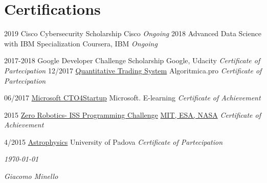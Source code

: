 \documentclass[]{friggeri-cv}
\begin{document}
\section{Certifications}
\begin{entrylist}
      \entry
    {2019}
    {Cisco Cybersecurity Scholarship}
    {Cisco}
    {\emph{Ongoing}}
     \entry
    {2018}
    {Advanced Data Science with IBM Specialization}
    {Coursera, IBM}
    {\emph{Ongoing}}
    
    \entry
    {2017-2018}
    {Google Developer Challenge Scholarship}
    {Google, Udacity}
    {\emph{Certificate of Partecipation}}
    \entry
    {12/2017}
    {\href{}{Quantitative Trading System}}
    {Algoritmica.pro}
    {\emph{Certificate of Partecipation}}
    
     \entry
    {06/2017}
    {\href{https://1drv.ms/b/s!Ap_mQ71ue930rA_aUmWtsK0-eAhH}{Microsoft CTO4Startup}}
    {Microsoft. E-learning}
    {\emph{Certificate of Achievement}}
    
    \entry
    {2015}
    {\href{https://1drv.ms/b/s!Ap_mQ71ue930qnfXZSS-T-ajhUl6}{Zero Robotics- ISS Programming Challenge}}
    {\href{http://zerorobotics.mit.edu/}{MIT, ESA, NASA}}
    {\emph{Certificate of Achievement}}
    
    \entry
    {4/2015}
    {\href{https://1drv.ms/b/s!Ap_mQ71ue930qm4jOnI8nepz64Aq}{Astrophysics}}
    {University of Padova}
    {\emph{Certificate of Partecipation}}


\end{entrylist}

\begin{flushleft}
\emph{\today}
\end{flushleft}
\begin{flushright}
\emph{Giacomo Minello}
\end{flushright}
\end{document}
